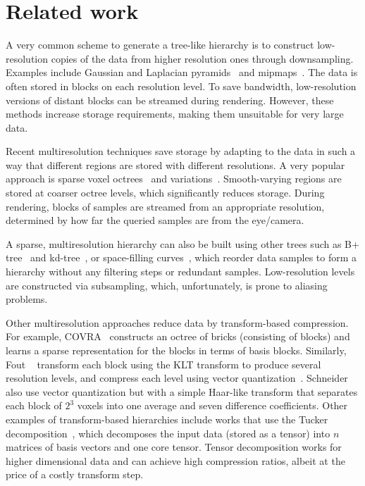 \section{Related work}

A very common scheme to generate a tree-like hierarchy is to construct low-resolution copies of the
data from higher resolution ones through downsampling. Examples include Gaussian and Laplacian
pyramids~\cite{laplacian-pyramid} and
mipmaps~\cite{multires_octree1999,interactive-exploration-ct-scans}. The data is often stored in
blocks on each resolution level. To save bandwidth, low-resolution versions of distant blocks can be
streamed during rendering. However, these methods increase storage requirements, making them
unsuitable for very large data.

Recent multiresolution techniques save storage by adapting to the data in such a way that different
regions are stored with different resolutions. A very popular approach is sparse voxel
octrees~\cite{gigavoxels,Gobbetti2008} and
variations~\cite{Fogal-2013-RayGuided,visualization-driven,large-scale-volume}. Smooth-varying
regions are stored at coarser octree levels, which significantly reduces storage. During rendering,
blocks of samples are streamed from an appropriate resolution, determined by how far the queried
samples are from the eye/camera.

A sparse, multiresolution hierarchy can also be built using other trees such as B+
tree~\cite{vdb2013} and kd-tree~\cite{fogal-kdtree,in-situ-sampling-particle}, or space-filling
curves~\cite{idx2001, mloc}, which reorder data samples to form a hierarchy without any filtering
steps or redundant samples. Low-resolution levels are constructed via subsampling, which,
unfortunately, is prone to aliasing problems.

Other multiresolution approaches reduce data by transform-based compression. For example,
COVRA~\cite{covra2012} constructs an octree of bricks (consisting of blocks) and learns a sparse
representation for the blocks in terms of basis blocks. Similarly, Fout \etal~\cite{hw_dvr2007}
transform each block using the KLT transform to produce several resolution levels, and compress each
level using vector quantization~\cite{vq1992}. Schneider~\etal~\cite{compression_domain2003} also
use vector quantization but with a simple Haar-like transform that separates each block of $2^3$
voxels into one average and seven difference coefficients. Other examples of transform-based
hierarchies include works that use the Tucker
decomposition~\cite{tensor_dvr2015,tamresh,tucker-thresholding,multiscale-tensor}, which decomposes
the input data (stored as a tensor) into $n$ matrices of basis vectors and one core tensor. Tensor
decomposition works for higher dimensional data and can achieve high compression ratios, albeit at
the price of a costly transform step.

